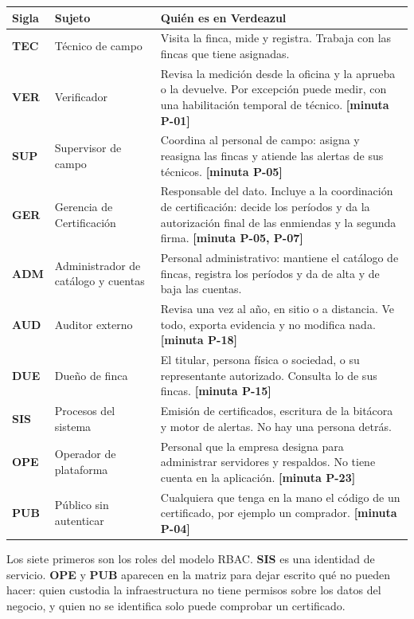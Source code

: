 \documentclass[11pt,letterpaper]{article}
\newcommand{\cab}[1]{\textbf{\rmfamily #1}}
\newcommand{\resp}[1]{\textrm{\footnotesize\bfseries [minuta #1]}}
\newcommand{\rol}[1]{\textrm{\bfseries #1}}
\begin{document}
\begin{center}
\small
\begin{tabularx}{\textwidth}{@{}L{1.1cm} L{3.7cm} Y@{}}
\toprule
\cab{Sigla} & \cab{Sujeto} & \cab{Quién es en Verdeazul} \\
\midrule
\rol{TEC} & Técnico de campo & Visita la finca, mide y registra. Trabaja con las fincas que tiene asignadas. \\
\rol{VER} & Verificador & Revisa la medición desde la oficina y la aprueba o la devuelve. Por excepción puede medir, con una habilitación temporal de técnico. \resp{P-01} \\
\rol{SUP} & Supervisor de campo & Coordina al personal de campo: asigna y reasigna las fincas y atiende las alertas de sus técnicos. \resp{P-05} \\
\rol{GER} & Gerencia de Certificación & Responsable del dato. Incluye a la coordinación de certificación: decide los períodos y da la autorización final de las enmiendas y la segunda firma. \resp{P-05, P-07} \\
\rol{ADM} & Administrador de catálogo y cuentas & Personal administrativo: mantiene el catálogo de fincas, registra los períodos y da de alta y de baja las cuentas. \\
\rol{AUD} & Auditor externo & Revisa una vez al año, en sitio o a distancia. Ve todo, exporta evidencia y no modifica nada. \resp{P-18} \\
\rol{DUE} & Dueño de finca & El titular, persona física o sociedad, o su representante autorizado. Consulta lo de sus fincas. \resp{P-15} \\
\rol{SIS} & Procesos del sistema & Emisión de certificados, escritura de la bitácora y motor de alertas. No hay una persona detrás. \\
\rol{OPE} & Operador de plataforma & Personal que la empresa designa para administrar servidores y respaldos. No tiene cuenta en la aplicación. \resp{P-23} \\
\rol{PUB} & Público sin autenticar & Cualquiera que tenga en la mano el código de un certificado, por ejemplo un comprador. \resp{P-04} \\
\bottomrule
\end{tabularx}
\end{center}

Los siete primeros son los roles del modelo RBAC. \rol{SIS} es una identidad de servicio. \rol{OPE} y
\rol{PUB} aparecen en la matriz para dejar escrito qué no pueden hacer: quien custodia la
infraestructura no tiene permisos sobre los datos del negocio, y quien no se identifica solo puede
comprobar un certificado.
\end{document}
